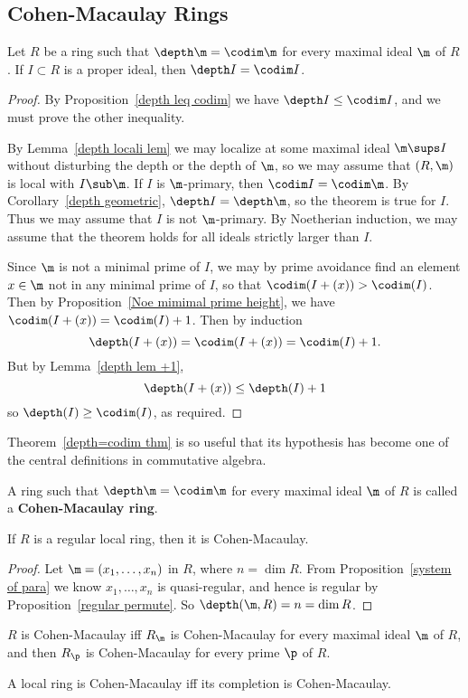 \subsection{Cohen-Macaulay Rings}
\begin{theorem}\label{depth=codim thm}
Let $R$ be a ring such that $\depth\m=\codim\m$ for every maximal ideal $\m$ of $R$. If $I\subset R$ is a proper ideal, then $\depth I=\codim I$.
\end{theorem}
\begin{proof}
By Proposition~\ref{depth leq codim} we have $\depth I\leq\codim I$, and we must prove the other inequality.\par
By Lemma~\ref{depth locali lem} we may localize at some maximal ideal $\m\sups I$ without disturbing the depth or the depth of $\m$, so we may assume that $(R,\m)$ is local with $I\sub\m$. If $I$ is $\m$-primary, then $\codim I=\codim\m$. By Corollary~\ref{depth geometric}, $\depth I=\depth\m$, so the theorem is true for $I$. Thus we may assume that $I$ is not $\m$-primary. By Noetherian induction, we may assume that the theorem holds for all ideals strictly larger than $I$.\par
Since $\m$ is not a minimal prime of $I$, we may by prime avoidance find an element $x\in\m$ not in any minimal prime of $I$, so that $\codim(I+(x))>\codim(I)$. Then by Proposition~\ref{Noe mimimal prime height}, we have $\codim(I+(x))=\codim(I)+1$. Then by induction
\[\depth(I+(x))=\codim(I+(x))=\codim(I)+1.\] 
But by Lemma~\ref{depth lem +1},
\[\depth(I+(x))\leq\depth(I)+1\] 
so $\depth(I)\geq\codim(I)$, as required.
\end{proof}
Theorem~\ref{depth=codim thm} is so useful that its hypothesis has become one of the central definitions in commutative algebra.
\begin{definition}
A ring such that $\depth\m=\codim\m$ for every maximal ideal $\m$ of $R$ is called a \textbf{Cohen-Macaulay ring}.
\end{definition}
\begin{proposition}\label{regular local Cohen}
If $R$ is a regular local ring, then it is Cohen-Macaulay.
\end{proposition}
\begin{proof}
Let $\m=(x_1,\dots,x_n)$ in $R$, where $n=\dim R$. From Proposition~\ref{system of para} we know $x_1,\dots,x_n$ is quasi-regular, and hence is regular by Proposition~\ref{regular permute}. So $\depth(\m,R)=n=\dim R$.
\end{proof}
\begin{proposition}\label{Cohen-Macaulay iff}
$R$ is Cohen-Macaulay iff $R_\m$ is Cohen-Macaulay for every maximal ideal $\m$ of $R$, and then $R_\p$ is Cohen-Macaulay for every prime $\p$ of $R$.\par 
A local ring is Cohen-Macaulay iff its completion is Cohen-Macaulay.
\end{proposition}
